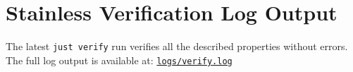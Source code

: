 \section{Stainless Verification Log Output}
\label{sec:appendix-b}

The latest \texttt{just verify} run verifies all the described properties
without errors. The full log output is available at:
\href{https://github.com/thiagomata/prime-numbers/blob/master/logs/verify.log}{\texttt{logs/verify.log}}
